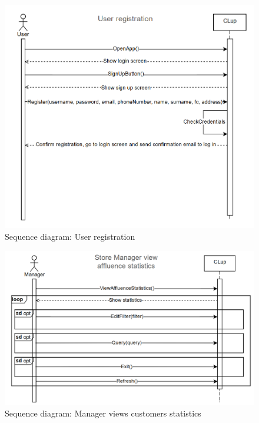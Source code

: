 \begin{figure}[H]
	\includegraphics[width=\linewidth]{../Diagrams/UserRegistration.png}
	\caption{Sequence diagram: User registration}
	\label{fig:UserReg}
\end{figure} 

\begin{figure}[H]
	\includegraphics[width=\linewidth]{../Diagrams/ViewStatistics.png}
	\caption{Sequence diagram: Manager views customers statistics}
	\label{fig:Stat}
\end{figure} 

